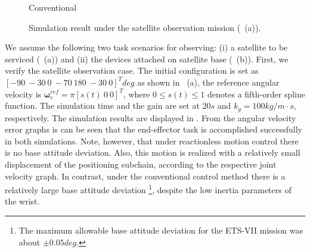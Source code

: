 \begin{figure}[t]
\begin{minipage}[h]{0.40\linewidth}
    \footnotesize\par{\hspace{8mm}\vspace{-2mm}Conventional}
  \end{minipage}
  \vspace{1em}
  \caption{Simulation result under the satellite observation mission (~(a)).}
  \label{fig:RES_INS}
\end{figure}
%
We assume the following two task scenarios for observing:
(i)  a satellite to be serviced (~(a)) and
(ii) the devices attached on  satellite base (~(b)).
First, we verify the satellite observation case.
The initial configuration is set as $[-90~-30~0~-70~180~-30~0]^{T}\unit{deg}$ as shown in ~(a),
the reference angular velocity is $\bm{\omega}_{e}^{ref} = \pi[s(t)~0~0]^{T}$,
where $0 \leq s(t) \leq 1$ denotes a fifth-order spline function. 
The simulation time and the gain are set at $20\unit{s}$ and $k_{g} = 100  \unit{kg/m \cdot s}$, respectively.
The simulation results are displayed in .
From the angular velocity error graphs is can be seen that the end-effector task is accomplished successfully
in both simulations. Note, however, that under reactionless motion control there is no base attitude deviation.
Also, this motion is realized with a relatively small displacement of the positioning subchain, 
according to the respective joint velocity graph. In contrast, under the conventional control method
there is a relatively large base attitude deviation%
\footnote{The maximum allowable base attitude deviation for the ETS-VII mission was about $\pm 0.05\unit{deg}$.}, 
despite the low inertia parameters of the wrist.

